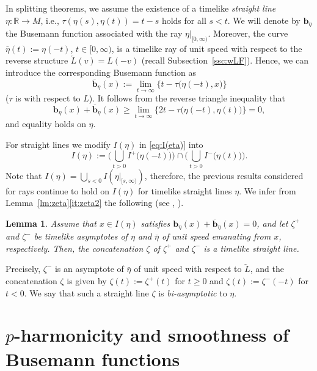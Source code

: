 \documentclass[a4paper,11pt]{article}
\numberwithin{equation}{section}
\theoremstyle{definition}
\theoremstyle{plain}
\newtheorem{lemma}[definition]{Lemma}
\newcommand{\lra}{\longrightarrow}
\newcommand{\R}{\ensuremath{\mathbb{R}}}
\newcommand{\bb}{\ensuremath{\mathbf{b}}}
\newcommand{\rev}[1]{\overleftarrow{#1}}
\newcommand{\ol}[1]{\overline{#1}}
\begin{document}
In splitting theorems, we assume the existence of a timelike \emph{straight line} $\eta\colon \R \lra M$, i.e., $\tau(\eta(s),\eta(t))=t-s$ holds for all $s<t$.
%
We will denote by $\bb_{\eta}$ the Busemann function associated with the ray $\eta|_{[0,\infty)}$.
Moreover, the curve $\bar{\eta}(t):=\eta(-t)$, $t \in [0,\infty)$, is a timelike ray of unit speed
with respect to the reverse structure $\rev{L}(v)=L(-v)$ (recall Subsection~\ref{ssc:wLF}).
Hence, we can introduce the corresponding Busemann function as
\[ \ol{\bb}_{\eta}(x):=\lim_{t \to \infty} \big\{ t-\tau\big( \eta(-t),x \big) \big\} \]
($\tau$ is with respect to $L$).
It follows from the reverse triangle inequality that
\begin{equation}\label{eq:b+b}
\bb_{\eta}(x)+\ol{\bb}_{\eta}(x) \ge \lim_{t \to \infty} \big\{ 2t -\tau\big( \eta(-t),\eta(t) \big) \big\} =0,
\end{equation}
and equality holds on $\eta$.

For straight lines we modify $I(\eta)$ in \eqref{eq:I(eta)} into
\[ I(\eta) :=\Bigg( \bigcup_{t>0} I^+\big( \eta(-t) \big) \Bigg)
 \cap \Bigg( \bigcup_{t>0} I^- \big( \eta(t) \big) \Bigg). \]
Note that $I(\eta) =\bigcup_{s<0} I(\eta|_{[s,\infty)})$,
therefore, the previous results considered for rays continue to hold on $I(\eta)$ for timelike straight lines $\eta$.
We infer from Lemma~\ref{lm:zeta}\eqref{it:zeta2} the following (see  \cite[Lemma~5.5]{LMO3}, \cite[Lemma~4.1]{Eschenburg:1988}).

\begin{lemma}\label{lm:line}
Assume that $x \in I(\eta)$ satisfies $\bb_\eta(x)+\ol{\bb}_\eta(x)=0$,
and let $\zeta^+$ and $\zeta^-$ be timelike asymptotes of $\eta$ and $\bar{\eta}$ of unit speed
emanating from $x$, respectively.
Then, the concatenation $\zeta$ of $\zeta^+$ and $\zeta^-$ is a timelike straight line.
\end{lemma}

Precisely, $\zeta^-$ is an asymptote of $\bar{\eta}$ of unit speed with respect to $\rev{L}$,
and the concatenation $\zeta$ is given by $\zeta(t):=\zeta^+(t)$ for $t \ge 0$ and $\zeta(t):=\zeta^-(-t)$ for $t<0$.
We say that such a straight line $\zeta$ is \emph{bi-asymptotic} to $\eta$.

\section{$p$-harmonicity and smoothness of Busemann functions}\label{sc:harm}
\end{document}
